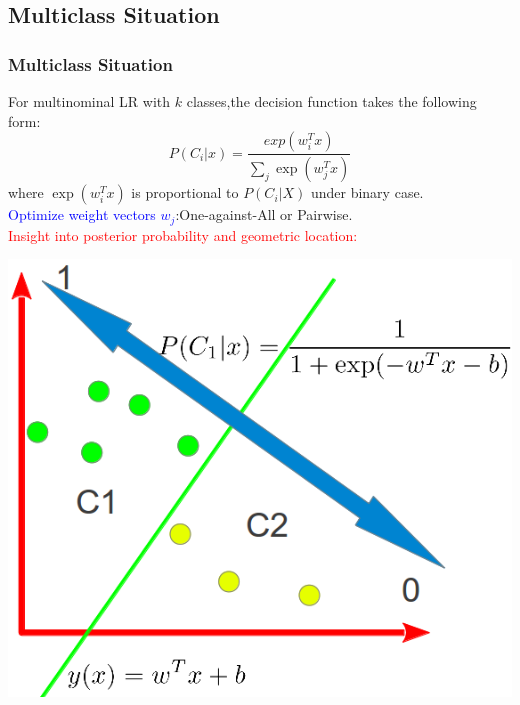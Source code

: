 \documentclass{beamer}
\begin{document}
\begin{CJK*}{UTF8}{gbsn}
\subsection{Multiclass Situation}
\begin{frame}\frametitle{Multiclass Situation}
For multinominal LR with $k$ classes,the decision function takes the following form:
\begin{equation}
P(C_i|x)=\frac{exp(w_i^Tx)}{\sum_j\exp(w_j^Tx)}
\end{equation}
where $\exp(w_i^Tx)$ is proportional to $P(C_i|X)$ under binary case.\\
\textcolor{blue}{Optimize weight vectors $w_j$}:One-against-All or Pairwise.\\
\textcolor{red}{Insight into posterior probability and geometric location:}
\begin{center}
\includegraphics[scale=0.25]{images/pic4}
\end{center}
\end{frame}


\end{CJK*}
\end{document}

